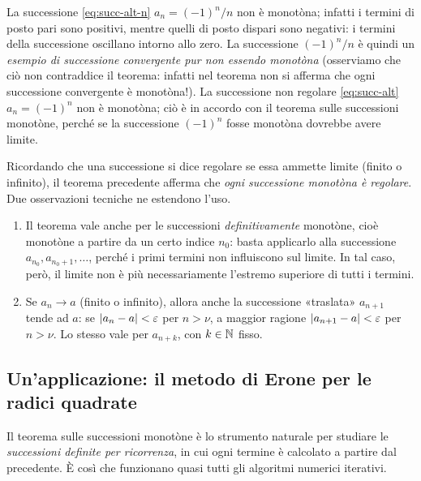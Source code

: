 \begin{osservazione}
La successione \eqref{eq:succ-alt-n} $a_{n}=(-1)^{n}/n$ non è monotòna; infatti i termini di
posto pari sono positivi, mentre quelli di posto dispari sono negativi: i termini della
successione oscillano intorno allo zero. La successione $(-1)^{n}/n$ è quindi un
\emph{esempio di successione convergente pur non essendo monotòna} (osserviamo che ciò non
contraddice il teorema: infatti nel teorema non si afferma che ogni successione
convergente è monotòna!). La successione non regolare \eqref{eq:succ-alt} $a_{n}=(-1)^{n}$
non è monotòna; ciò è in accordo con il teorema sulle successioni monotòne, perché se la
successione $(-1)^{n}$ fosse monotòna dovrebbe avere limite.
\end{osservazione}

Ricordando che una successione si dice regolare se essa ammette limite (finito o
infinito), il teorema precedente afferma che \emph{ogni successione monotòna è regolare}.
Due osservazioni tecniche ne estendono l'uso.

\begin{osservazione}\label{oss:traslata}
\leavevmode
\begin{enumerate}
  \item Il teorema vale anche per le successioni \emph{definitivamente} monotòne, cioè
  monotòne a partire da un certo indice $n_{0}$: basta applicarlo alla successione
  $a_{n_{0}},a_{n_{0}+1},\dots$, perché i primi termini non influiscono sul limite. In tal
  caso, però, il limite non è più necessariamente l'estremo superiore di tutti i termini.
  \item Se $a_{n}\to a$ (finito o infinito), allora anche la successione «traslata»
  $a_{n+1}$ tende ad $a$: se $\lvert a_{n}-a\rvert<\varepsilon$ per $n>\nu$, a maggior ragione
  $\lvert a_{n+1}-a\rvert<\varepsilon$ per $n>\nu$. Lo stesso vale per $a_{n+k}$, con $k\in\mathbb{N}$ fisso.
\end{enumerate}
\end{osservazione}

\subsection{Un'applicazione: il metodo di Erone per le radici quadrate}

Il teorema sulle successioni monotòne è lo strumento naturale per studiare le
\emph{successioni definite per ricorrenza},
in cui ogni termine è calcolato a partire dal precedente. È così che funzionano quasi
tutti gli algoritmi numerici iterativi.


